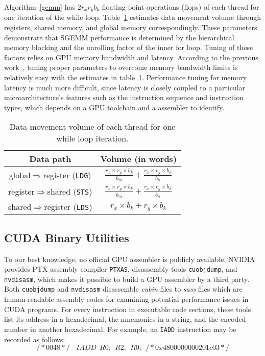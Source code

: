 Algorithm~\ref{gemm} has $2 r_x r_y b_k$ floating-point operations (flops) of each thread for one iteration of the while loop.
Table~\ref{tab:dm} estimates data movement volume through registers, shared memory, and global 
memory correspondingly.
These parameters demonstrate that SGEMM performance is determined by the hierarchical memory blocking and the unrolling factor of the inner for loop.
Tuning of these factors relies on GPU memory bandwidth and latency. 
According to the previous work~\cite{magma,tan}, tuning proper parameters to overcome memory bandwidth limits is relatively easy with the estimates in table~\ref{tab:dm}.
Performance tuning for memory latency is much more difficult, since latency is closely coupled to a particular microarchitecture's features such as the instruction sequence and instruction types, which depends on a GPU toolchain and a assembler to identify. 


\begin{table}[htbp]
    \caption{Data movement volume of each thread for one while loop iteration.} %
\centering
\scalebox{1.0} {
\begin{tabular}{|c|c|}
\hline
    Data path& Volume (in words)\\
\hline
    global$\Rightarrow$register ({\tt LDG})& $\frac{r_x \times r_y \times b_k}{b_m} + \frac{r_x\times r_y \times b_k}{b_n}$ \\
\hline
register$\Rightarrow$shared ({\tt STS})& $\frac{r_x \times r_y \times b_k}{b_m} + \frac{r_x\times r_y \times b_k}{b_n}$ \\
\hline
shared$\Rightarrow$register ({\tt LDS})& $r_x\times b_k + r_y\times b_k$\\
\hline
\end{tabular}
}
\label{tab:dm}
\end{table}


\subsection{CUDA Binary Utilities}
\label{sec:cuda}

To our best knowledge, no official GPU assembler is publicly available.
NVIDIA provides PTX assembly compiler {\tt PTXAS}, disassembly tools {\tt cuobjdump}, and {\tt nvdisasm}, which makes it possible to build a GPU assembler by a third party.
Both {\tt cuobjdump} and {\tt nvdisasm} disassemble {\em cubin} files to {\em sass} files which are human-readable assembly codes for examining potential performance issues in CUDA programs. 
For every instruction in executable code sections, these tools list its address in a hexadecimal, the mnemonics in a string, and the encoded number in another hexadecimal. 
For example, an {\tt IADD} instruction may be recorded as follows:
{\small
\begin{equation}
\label{eq:iadd}
/*0048*/~~~~IADD~~R0,~~R2,~~R0;~~/* 0x4800000000201c03 */
\end{equation}
}

